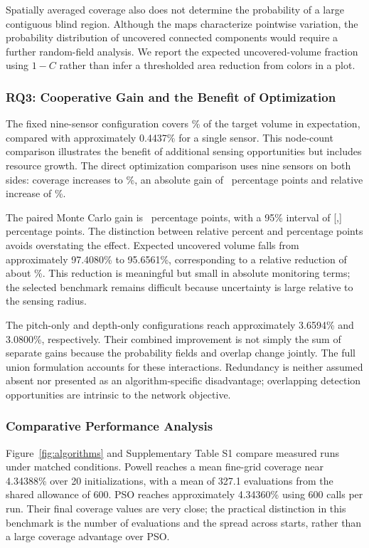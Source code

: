 \documentclass[fleqn,10pt]{wlscirep}
\begin{document}
Spatially averaged coverage also does not determine the probability of a large contiguous blind region. Although the maps characterize pointwise variation, the probability distribution of uncovered connected components would require a further random-field analysis. We report the expected uncovered-volume fraction using $1-C$ rather than infer a thresholded area reduction from colors in a plot.

\subsubsection*{RQ3: Cooperative Gain and the Benefit of Optimization}
The fixed nine-sensor configuration covers \FixedCov\% of the target volume in expectation, compared with approximately 0.4437\% for a single sensor. This node-count comparison illustrates the benefit of additional sensing opportunities but includes resource growth. The direct optimization comparison uses nine sensors on both sides: coverage increases to \OptCov\%, an absolute gain of \AbsGain\ percentage points and relative increase of \RelGain\%.

The paired Monte Carlo gain is \PairGain\ percentage points, with a 95\% interval of [\PairLow,\PairHigh] percentage points. The distinction between relative percent and percentage points avoids overstating the effect. Expected uncovered volume falls from approximately 97.4080\% to 95.6561\%, corresponding to a relative reduction of about \BlindGain\%. This reduction is meaningful but small in absolute monitoring terms; the selected benchmark remains difficult because uncertainty is large relative to the sensing radius.

The pitch-only and depth-only configurations reach approximately 3.6594\% and 3.0800\%, respectively. Their combined improvement is not simply the sum of separate gains because the probability fields and overlap change jointly. The full union formulation accounts for these interactions. Redundancy is neither assumed absent nor presented as an algorithm-specific disadvantage; overlapping detection opportunities are intrinsic to the network objective.

\subsubsection*{Comparative Performance Analysis}
Figure~\ref{fig:algorithms} and Supplementary Table S1 compare measured runs under matched conditions. Powell reaches a mean fine-grid coverage near 4.34388\% over 20 initializations, with a mean of 327.1 evaluations from the shared allowance of 600. PSO reaches approximately 4.34360\% using 600 calls per run. Their final coverage values are very close; the practical distinction in this benchmark is the number of evaluations and the spread across starts, rather than a large coverage advantage over PSO.
\end{document}
